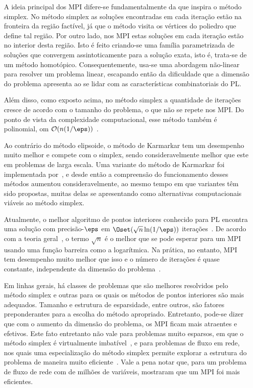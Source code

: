 A ideia principal dos \ac{MPI} difere-se fundamentalmente da que inspira o
método simplex. No método simplex as soluções encontradas em cada iteração estão
na fronteira da região factível, já que o método visita os vértices do poliedro
que define tal região. Por outro lado, nos \ac{MPI} estas soluções em cada
iteração estão no interior desta região. Isto é feito criando-se uma família
parametrizada de soluções que convergem assintoticamente para a solução exata,
isto é, trata-se de um método homotópico.
Consequentemente, usa-se uma abordagem não-linear para resolver um problema
linear, escapando então da  dificuldade que a dimensão do problema apresenta ao
se lidar com as características combinatoriais  do \ac{PL}.


Além disso,  como exposto acima,  no método simplex a quantidade de
iterações cresce de acordo com o tamanho do problema,  o que não se repete
nos \ac{MPI}. Do ponto de vista
da complexidade computacional, esse método também é polinomial,  om
$\mathcal{O}(n(1/\eps))$~\cite{Karmarkar:1984cp}.
 
  
Ao contrário do método elipsoide, o método de Karmarkar tem um desempenho muito
melhor e compete com o simplex, sendo consideravelmente melhor  que este em
problemas de larga escala. Uma variante do método de Karmarkar foi implementada
por~\textcite{Adler:1989fw}, e desde então a compreensão do funcionamento desses
métodos aumentou consideravelmente, ao mesmo tempo em que variantes têm
sido propostas, muitas delas se apresentando como alternativas computacionais
viáveis ao método simplex.

Atualmente, o melhor algoritmo de pontos interiores conhecido para \ac{PL}
encontra uma solução com precisão-$\eps$ em $\Oset(\sqrt{n}\ln(1/\eps))$
iterações~\cite{Renegar:1988cr}.
De acordo com a teoria geral~\cite[Capítulo 4]{Nesterov:2003wi}, o termo
$\sqrt{n}$  é o melhor que se pode esperar para um \ac{MPI} usando uma função barreira como a
logarítmica. Na prática, no entanto, \ac{MPI} tem desempenho muito melhor que
isso e o número de iterações é quase constante, independente da dimensão do
problema~\cite{Colombo:2008ia}.

Em linhas gerais, há classes de problemas que são melhores resolvidos
pelo método simplex e outras para os quais os métodos de pontos interiores são mais
adequados. Tamanho e estrutura de esparsidade, entre outros, são fatores
preponderantes para a escolha do  método apropriado. Entretanto, pode-se dizer
que com o aumento da dimensão do problema, os \ac{MPI} ficam mais atraentes e
efetivos. Este fato entretanto não vale para problemas muito esparsos, em que o
método simplex é virtualmente imbatível~\cite{Hall:2005vw}, e para problemas
de fluxo em rede, nos quais uma especialização do método simplex permite
explorar a estrutura do problema de maneira muito
eficiente~\cite{Nemhauser:Integer-and-combinatorial:1988s}. Vale a pena notar
que, para um problema de fluxo de rede com de milhões de variáveis, 
\textcite{Resende:1993uu} mostraram que um \ac{MPI} foi mais
eficientes.



